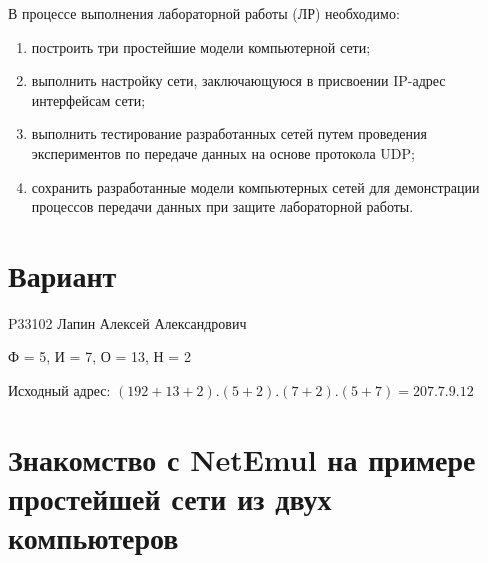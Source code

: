 \documentclass[12pt,onecolumn]{article}
\begin{document}
В процессе выполнения лабораторной работы (ЛР) необходимо:

\begin{enumerate}
    \item построить три простейшие модели компьютерной сети;
    \item выполнить настройку сети, заключающуюся в присвоении IP-адрес интерфейсам сети;
    \item выполнить тестирование разработанных сетей путем проведения экспериментов по передаче данных на основе протокола UDP;
    \item сохранить разработанные модели компьютерных сетей для демонстрации процессов передачи данных при защите лабораторной работы.
\end{enumerate}
\section*{Вариант}

P33102 Лапин Алексей Александрович

Ф = 5, И = 7, О = 13, Н = 2

Исходный адрес: $(192 + 13 + 2).(5+2).(7+2).(5+7) = 207.7.9.12$


\section{Знакомство с NetEmul на примере простейшей сети из двух компьютеров}
\end{document}
